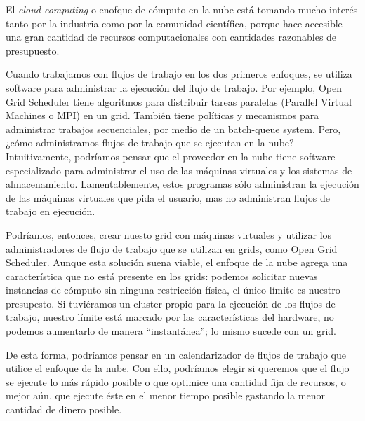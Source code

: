 \documentclass{article}
\begin{document}
El \emph{cloud computing} o enofque de cómputo en la nube está tomando mucho interés tanto por la industria como por la comunidad científica, porque hace accesible una gran cantidad de recursos computacionales con cantidades razonables de presupuesto.

Cuando trabajamos con flujos de trabajo en los dos primeros enfoques, se utiliza software para administrar la ejecución del flujo de trabajo. Por ejemplo, Open Grid Scheduler tiene algoritmos para distribuir tareas paralelas (Parallel Virtual Machines o MPI) en un grid. También tiene políticas y mecanismos para administrar trabajos secuenciales, por medio de un batch-queue system. Pero, ¿cómo administramos flujos de trabajo que se ejecutan en la nube? Intuitivamente, podríamos pensar que el proveedor en la nube tiene software especializado para administrar el uso de las máquinas virtuales y los sistemas de almacenamiento. Lamentablemente, estos programas sólo administran la ejecución de las máquinas virtuales que pida el usuario, mas no administran flujos de trabajo en ejecución. 

Podríamos, entonces, crear nuesto grid con máquinas virtuales y utilizar los administradores de flujo de trabajo que se utilizan en grids, como Open Grid Scheduler. Aunque esta solución suena viable, el enfoque de la nube agrega una característica que no está presente en los grids: podemos solicitar nuevas instancias de cómputo sin ninguna restricción física, el único límite es nuestro presupesto. Si tuviéramos un cluster propio para la ejecución de los flujos de trabajo, nuestro límite está marcado por las características del hardware, no podemos aumentarlo de manera ``instantánea''; lo mismo sucede con un grid.

De esta forma, podríamos pensar en un calendarizador de flujos de trabajo que utilice el enfoque de la nube. Con ello, podríamos elegir si queremos que el flujo se ejecute lo más rápido posible o que optimice una cantidad fija de recursos, o mejor aún, que ejecute éste en el menor tiempo posible gastando la menor cantidad de dinero posible.




\end{document}
